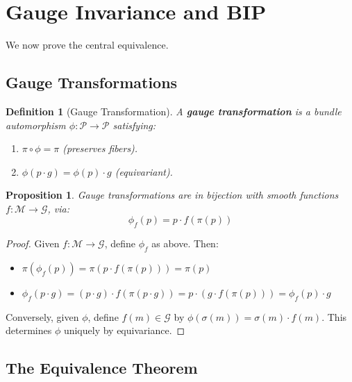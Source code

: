 \documentclass[11pt]{article}
\newtheorem{proposition}[theorem]{Proposition}
\newtheorem{definition}[theorem]{Definition}
\begin{document}
\section{Gauge Invariance and BIP}

We now prove the central equivalence.

\subsection{Gauge Transformations}

\begin{definition}[Gauge Transformation]
A \textbf{gauge transformation} is a bundle automorphism
$\phi : \mathcal{P} \to \mathcal{P}$ satisfying:
\begin{enumerate}
    \item[(i)] $\pi \circ \phi = \pi$ (preserves fibers).
    \item[(ii)] $\phi(p \cdot g) = \phi(p) \cdot g$ (equivariant).
\end{enumerate}
\end{definition}

\begin{proposition}
Gauge transformations are in bijection with smooth functions $f : \mathcal{M} \to \mathcal{G}$,
via:
\[
\phi_f(p) = p \cdot f(\pi(p))
\]
\end{proposition}

\begin{proof}
Given $f : \mathcal{M} \to \mathcal{G}$, define $\phi_f$ as above. Then:
\begin{itemize}
    \item $\pi(\phi_f(p)) = \pi(p \cdot f(\pi(p))) = \pi(p)$
    \item $\phi_f(p \cdot g) = (p \cdot g) \cdot f(\pi(p \cdot g)) = p \cdot (g \cdot f(\pi(p))) = \phi_f(p) \cdot g$
\end{itemize}
Conversely, given $\phi$, define $f(m) \in \mathcal{G}$ by $\phi(\sigma(m)) = \sigma(m) \cdot f(m)$. This determines $\phi$ uniquely
by equivariance.
\end{proof}

\subsection{The Equivalence Theorem}
\end{document}
